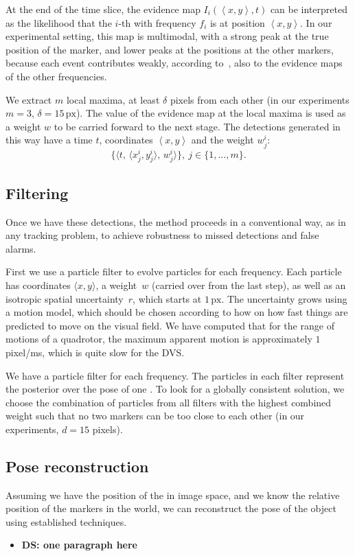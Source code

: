 At the end of the time slice, the evidence map $I_{i}(\left\langle x,y\right\rangle ,t)$
can be interpreted as the likelihood that the $i$-th \ALM with frequency
$f_{i}$ is at position $\left\langle x,y\right\rangle $. In our
experimental setting, this map is multimodal, with a strong peak at
the true position of the marker, and lower peaks at the positions
at the other markers, because each event contributes weakly, according
to~, also to the evidence maps of the other
frequencies. 

We extract $m$ local maxima, at least $\delta$ pixels from each
other (in our experiments $m=3$, $\delta=15\,\mbox{px}$). The value
of the evidence map at the local maxima is used as a weight $w$ to
be carried forward to the next stage. The detections generated in
this way have a time $t$, coordinates $\left\langle x,y\right\rangle $
and the weight $w_{j}^{i}$: 
\[
\{\langle t,\,\langle x_{j}^{i},y_{j}^{i}\rangle,\, w_{j}^{i}\rangle\},\ j\in\{1,\dots,m\}.
\]



\subsection{Filtering }

Once we have these detections, the method proceeds in a conventional
way, as in any tracking problem, to achieve robustness to missed detections
and false alarms. 

First we use a particle filter to evolve particles for each frequency.
Each particle has coordinates $\langle x,y\rangle$, a weight~$w$
(carried over from the last step), as well as an isotropic spatial
uncertainty~$r$, which starts at $1\,\mbox{px}$. The uncertainty
grows using a motion model, which should be chosen according to how
on how fast things are predicted to move on the visual field. We have
computed that for the range of motions of a quadrotor, the maximum
apparent motion is approximately $1$ pixel/ms, which is quite slow
for the DVS.

We have a particle filter for each frequency. The particles in each
filter represent the posterior over the pose of one \ALM. To look
for a globally consistent solution, we choose the combination of particles
from all filters with the highest combined weight such that no two
markers can be too close to each other (in our experiments, $d=15$
pixels). 




\subsection{Pose reconstruction}

Assuming we have the position of the \ALMs in image space, and we
know the relative position of the markers in the world, we can reconstruct
the pose of the object using established techniques.
\begin{itemize}
\item \textbf{DS: one paragraph here }
\end{itemize}
\lorem
